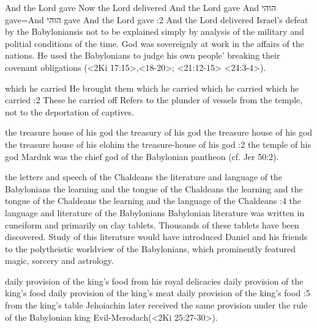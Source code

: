     {And the Lord gave} %
    {Now the Lord delivered} %
    {And the Lord gave} %
    {And      הוהי       gave}={And {\HebrewFont   הוהי}  gave} %
    {And the Lord gave} %
:2 {And the Lord delivered} Israel's defeat by the Babyloniansis 
not to be explained simply by analysis of the military and politial
conditions of the time. God was sovereignly at work in the affairs of 
the nations. He used the Babylonians to judge his own people' 
breaking their covenant obligations (<2Ki 17:15>,<18-20>; <21:12-15> 
<24:3-4>).

    {which he carried} %
    {He brought them} %
    {which he carried} %
    {which he carried} %
    {which he carried} %
:2 {These he carried off} Refers to the plunder of vessels 
from the temple, not to the deportation of captives. 

    {the treasure house of his god} %
    {the treasury of his god} %
    {the treasure house of his god} %
    {the treasure house of his elohim} %
    {the treasure-house of his god} %
:2 {the temple of his god} 
Marduk was the chief god of the Babylonian pantheon (cf. Jer 50:2).

    {the letters and speech of the Chaldeans} %
    {the literature and language of the Babylonians} %
    {the learning and the tongue of the Chaldeans} %
    {the learning and the tongue of the Chaldeans} %
    {the learning and the language of the Chaldeans} %
:4 {the language and literature of the Babylonians} Babylonian literature was written in
cuneiform and primarily on clay tablets. Thousands of these tablets have been discovered. Study of 
this literature would have introduced Daniel and his friends to the 
polytheistic worldview of the Babylonians, which prominently featured magic, sorcery and astrology. 


    {daily provision of the king's food} %
    {from his royal delicacies} %
    {daily provision of the king's food} %
    {daily provision of the king's meat} %
    {daily provision of the king's food} %
:5 {from the king's table} Jehoiachin later received the same 
provision under the rule of the Babylonian king Evil-Merodach(<2Ki 25:27-30>).

